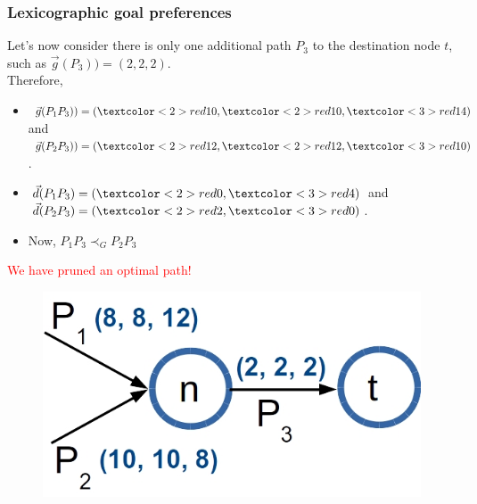 \begin{frame}
\frametitle{Lexicographic goal preferences}
	\begin{example}
		\vspace{1mm}	
		Let's now consider there is only one additional path $P_3$ to the destination node $t$, such as $\vec g(P_3)) = (2, 2, 2)$. \\
		Therefore, \\ 
		\begin{itemize}
			\item $\vec g(P_1 P_3)) = (\textcolor<2>{red}{10}, \textcolor<2>{red}{10}, \textcolor<3>{red}{14})$ and $\vec g(P_2 P_3)) = (\textcolor<2>{red}{12}, \textcolor<2>{red}{12}, \textcolor<3>{red}{10})$. 
			\item $\vec d(P_1 P_3) = (\textcolor<2>{red}{0},\textcolor<3>{red}{4})$ and $\vec d(P_2 P_3) = (\textcolor<2>{red}{2},\textcolor<3>{red}{0})$. 
			\item Now, \textcolor{ao}{$P_1 P_3 \prec_G P_2 P_3$}
		\end{itemize}
		\textcolor{red}{We have pruned an optimal path!}
		\vspace{1mm}	
	\end{example}
	\begin{figure}
    \centering
    		\includegraphics[scale=0.3]{figs/optimality-principle2}
  	\end{figure}
\note{}
\end{frame}
